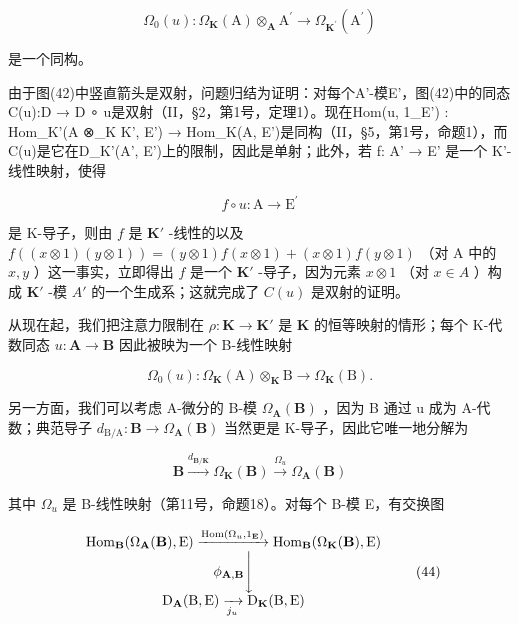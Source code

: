 \[
\Omega_ {0} (u): \Omega_ {\mathbf {K}} (\mathrm{A}) \otimes_ {\mathbf {A}} \mathrm{A} ^ {\prime} \rightarrow \Omega_ {\mathbf {K} ^ {\prime}} (\mathrm{A} ^ {\prime})
\]

是一个同构。

由于图(42)中竖直箭头是双射，问题归结为证明：对每个A'-模E'，图(42)中的同态C(u):D → D ∘ u是双射（II，§2，第1号，定理1）。现在Hom(u, 1\_E') : Hom\_K'(A ⊗\_K K', E') → Hom\_K(A, E')是同构（II，§5，第1号，命题1），而C(u)是它在D\_K'(A', E')上的限制，因此是单射；此外，若 f: A' → E' 是一个 K'-线性映射，使得

\[
f \circ u: \mathrm{A} \rightarrow \mathrm{E} ^ {\prime}
\]

是 K-导子，则由 \(f\) 是 \(\mathbf{K}'\) -线性的以及 \(f((x \otimes 1)(y \otimes 1)) = (y \otimes 1)f(x \otimes 1) + (x \otimes 1)f(y \otimes 1)\) （对 A 中的 \(x, y\) ）这一事实，立即得出 \(f\) 是一个 \(\mathbf{K}'\) -导子，因为元素 \(x \otimes 1\) （对 \(x \in A\) ）构成 \(\mathbf{K}'\) -模 \(A'\) 的一个生成系；这就完成了 \(C(u)\) 是双射的证明。

从现在起，我们把注意力限制在 \(\rho: \mathbf{K} \to \mathbf{K}'\) 是 \(\mathbf{K}\) 的恒等映射的情形；每个 K-代数同态 \(u: \mathbf{A} \to \mathbf{B}\) 因此被映为一个 B-线性映射

\[
\Omega_ {0} (u): \Omega_ {\mathbf {K}} (\mathrm{A}) \otimes_ {\mathbf {K}} \mathrm{B} \rightarrow \Omega_ {\mathbf {K}} (\mathrm{B}).\tag{43}
\]

另一方面，我们可以考虑 A-微分的 B-模 \(\Omega_{\mathbf{A}}(\mathbf{B})\) ，因为 B 通过 u 成为 A-代数；典范导子 \(d_{\mathrm{B/A}}: \mathbf{B} \to \Omega_{\mathbf{A}}(\mathbf{B})\) 当然更是 K-导子，因此它唯一地分解为

\[
\mathbf {B} \xrightarrow {d _ {\mathbf {B} / \mathbf {K}}} \Omega_ {\mathbf {K}} (\mathbf {B}) \xrightarrow {\Omega_ {u}} \Omega_ {\mathbf {A}} (\mathbf {B})
\]

其中 \(\Omega_{u}\) 是 B-线性映射（第11号，命题18）。对每个 B-模 E，有交换图

\[
\begin{array}{c} \operatorname{Hom} _ {\mathbf {B}} (\Omega_ {\mathbf {A}} (\mathbf {B}), \mathrm{E}) \xrightarrow {\operatorname{Hom} (\Omega_ {u} , 1 _ {\mathbf {E}})} \operatorname{Hom} _ {\mathbf {B}} (\Omega_ {\mathbf {K}} (\mathbf {B}), \mathrm{E}) \\ \phi_ {\mathbf {A}, \mathbf {B}} \Biggl \downarrow \\ \mathrm{D} _ {\mathbf {A}} (\mathrm{B}, \mathrm{E}) \xrightarrow [ j _ {u} ]{} \mathrm{D} _ {\mathbf {K}} (\mathrm{B}, \mathrm{E}) \end{array}\tag{44}
\]

